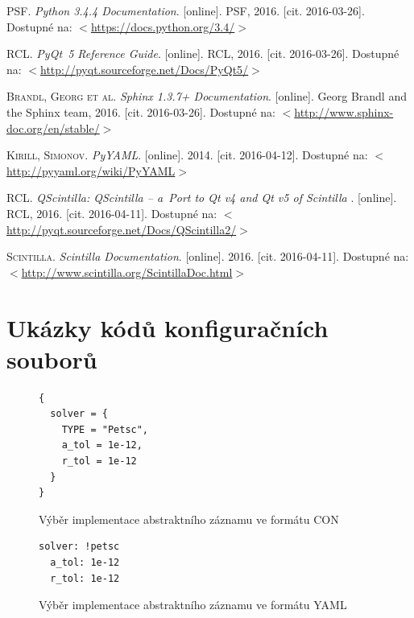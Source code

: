 \documentclass[FM,bw,DP]{tulthesis}
\begin{document}
\begin{thebibliography}{99}
\acrshort{PSF}. \textit{Python 3.4.4 Documentation}. [online]. \acrfull{PSF}, 2016. [cit. 2016-03-26]. Dostupné na: $<$\url{https://docs.python.org/3.4/}$>$

\textsc{\acrshort{RCL}.} \textit{PyQt~5 Reference Guide}. [online]. \acrfull{RCL}, 2016. [cit. 2016-03-26]. Dostupné na: $<$\url{http://pyqt.sourceforge.net/Docs/PyQt5/}$>$

\textsc{Brandl, Georg et al.} \textit{Sphinx 1.3.7+ Documentation}. [online]. Georg Brandl and the Sphinx team, 2016. [cit. 2016-03-26]. Dostupné na: $<$\url{http://www.sphinx-doc.org/en/stable/}$>$

\textsc{Kirill, Simonov.} \textit{PyYAML}. [online]. 2014. [cit. 2016-04-12]. Dostupné na: $<$\url{http://pyyaml.org/wiki/PyYAML}$>$

\textsc{\acrshort{RCL}}. \textit{QScintilla: QScintilla -- a~Port to Qt v4 and Qt v5 of Scintilla }. [online]. \acrfull{RCL}, 2016. [cit. 2016-04-11]. Dostupné na: $<$\url{http://pyqt.sourceforge.net/Docs/QScintilla2/}$>$

\textsc{Scintilla}. \textit{Scintilla Documentation}. [online]. 2016. [cit. 2016-04-11]. Dostupné na: $<$\url{http://www.scintilla.org/ScintillaDoc.html}$>$



\end{thebibliography}

\clearpage
\appendix


\chapter{Ukázky kódů konfiguračních souborů}

\lstset{style=code}

\begin{figure}[h]
\begin{lstlisting}
{
  solver = {
    TYPE = "Petsc",
    a_tol = 1e-12,
    r_tol = 1e-12
  }
}
\end{lstlisting}
\vspace*{-20pt}
\caption{Výběr implementace abstraktního záznamu ve formátu CON}
\label{img:abstract-record-con}
\end{figure}

\begin{figure}[h]
\begin{lstlisting}
solver: !petsc
  a_tol: 1e-12
  r_tol: 1e-12
\end{lstlisting}
\vspace*{-20pt}
\caption{Výběr implementace abstraktního záznamu ve formátu YAML}
\label{img:abstract-record-yaml}
\end{figure}
\end{document}
